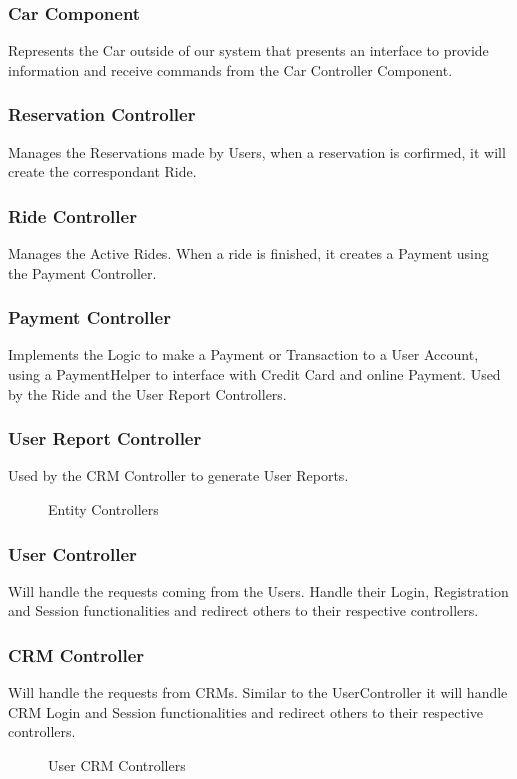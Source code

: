 \documentclass[a4paper]{article}
\begin{document}
\subsubsection{Car Component}
Represents the Car outside of our system that presents an interface to provide information and receive commands from the Car Controller Component.
\subsubsection{Reservation Controller}
Manages the Reservations made by Users, when a reservation is corfirmed, it will create the correspondant Ride.
\subsubsection{Ride Controller}
Manages the Active Rides. When a ride is finished, it creates a Payment using the Payment Controller.
\subsubsection{Payment Controller}
Implements the Logic to make a Payment or Transaction to a User Account, using a PaymentHelper to interface with Credit Card and online Payment. Used by the Ride and the User Report Controllers.
\subsubsection{User Report Controller}
Used by the CRM Controller to generate User Reports.
\begin{figure}[h]
\centering
\vspace*{\fill}
\noindent{}%
\caption {Entity Controllers}
\vspace*{0.5cm}
\end{figure}
\subsubsection{User Controller}
Will handle the requests coming from the Users. Handle their Login, Registration and Session functionalities and redirect others to their respective controllers.
\subsubsection{CRM Controller}
Will handle the requests from CRMs. Similar to the UserController it will handle CRM Login and Session functionalities and redirect others to their respective controllers.
\newline
\begin{figure}[h]
\centering
\vspace*{\fill}
\noindent{}%
\caption {User CRM Controllers}
\vspace*{0.1cm}
\end{figure}
\end{document}
